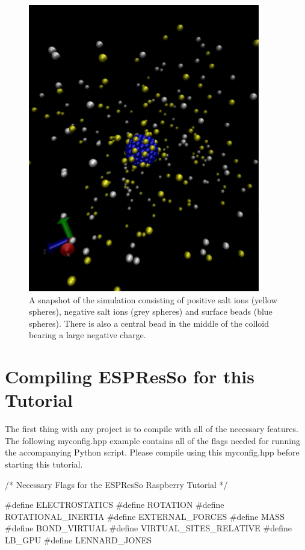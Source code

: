 \documentclass[
paper=a4,                       %
fontsize=11pt,                  %
twoside,                        %
footsepline,                    %
headsepline,                    %
headinclude=false,              %
footinclude=false,              %
pagesize,                       %
]{scrartcl}
\begin{document}
\begin{figure}[]
	\centering
	\includegraphics[width=0.9\textwidth]{figures/raspberry_snapshot}
	\caption{A snapshot of the simulation consisting of positive salt ions (yellow spheres), negative salt ions (grey spheres) and surface beads (blue spheres). There is also a central bead in the middle of the colloid bearing a large negative  charge.}
	\label{fig:rasp_snapshot}
\end{figure} 

\section{Compiling ESPResSo for this Tutorial}\label{sec:compiler_flags}
The first thing with any \es{} project is to compile \es{} with all of the necessary features.
The following myconfig.hpp example contains all of the flags needed for running the accompanying Python script.
Please compile \es{} using this myconfig.hpp before starting this tutorial.
{\small\vspace{0,2cm}
\begin{pypresso}[numbers=none]
/* Necessary Flags for the ESPResSo Raspberry Tutorial */

#define ELECTROSTATICS
#define ROTATION
#define ROTATIONAL_INERTIA
#define EXTERNAL_FORCES
#define MASS
#define BOND_VIRTUAL
#define VIRTUAL_SITES_RELATIVE
#define LB_GPU
#define LENNARD_JONES
\end{pypresso}\vspace{0,2cm}
}
\end{document}
